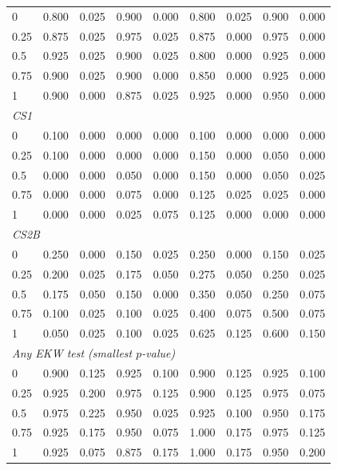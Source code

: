 \begin{table}[htbp]
\begin{tabular}{lcccccccc}
0 & 0.800 & 0.025 & 0.900 & 0.000 & 0.800 & 0.025 & 0.900 & 0.000 \\
0.25 & 0.875 & 0.025 & 0.975 & 0.025 & 0.875 & 0.000 & 0.975 & 0.000 \\
0.5 & 0.925 & 0.025 & 0.900 & 0.025 & 0.800 & 0.000 & 0.925 & 0.000 \\
0.75 & 0.900 & 0.025 & 0.900 & 0.000 & 0.850 & 0.000 & 0.925 & 0.000 \\
1 & 0.900 & 0.000 & 0.875 & 0.025 & 0.925 & 0.000 & 0.950 & 0.000 \\
\midrule
\multicolumn{9}{l}{\textit{CS1}} \\
0 & 0.100 & 0.000 & 0.000 & 0.000 & 0.100 & 0.000 & 0.000 & 0.000 \\
0.25 & 0.100 & 0.000 & 0.000 & 0.000 & 0.150 & 0.000 & 0.050 & 0.000 \\
0.5 & 0.000 & 0.000 & 0.050 & 0.000 & 0.150 & 0.000 & 0.050 & 0.025 \\
0.75 & 0.000 & 0.000 & 0.075 & 0.000 & 0.125 & 0.025 & 0.025 & 0.000 \\
1 & 0.000 & 0.000 & 0.025 & 0.075 & 0.125 & 0.000 & 0.000 & 0.000 \\
\midrule
\multicolumn{9}{l}{\textit{CS2B}} \\
0 & 0.250 & 0.000 & 0.150 & 0.025 & 0.250 & 0.000 & 0.150 & 0.025 \\
0.25 & 0.200 & 0.025 & 0.175 & 0.050 & 0.275 & 0.050 & 0.250 & 0.025 \\
0.5 & 0.175 & 0.050 & 0.150 & 0.000 & 0.350 & 0.050 & 0.250 & 0.075 \\
0.75 & 0.100 & 0.025 & 0.100 & 0.025 & 0.400 & 0.075 & 0.500 & 0.075 \\
1 & 0.050 & 0.025 & 0.100 & 0.025 & 0.625 & 0.125 & 0.600 & 0.150 \\
\midrule
\multicolumn{9}{l}{\textit{Any EKW test (smallest $p$-value)}} \\
0 & 0.900 & 0.125 & 0.925 & 0.100 & 0.900 & 0.125 & 0.925 & 0.100 \\
0.25 & 0.925 & 0.200 & 0.975 & 0.125 & 0.900 & 0.125 & 0.975 & 0.075 \\
0.5 & 0.975 & 0.225 & 0.950 & 0.025 & 0.925 & 0.100 & 0.950 & 0.175 \\
0.75 & 0.925 & 0.175 & 0.950 & 0.075 & 1.000 & 0.175 & 0.975 & 0.125 \\
1 & 0.925 & 0.075 & 0.875 & 0.175 & 1.000 & 0.175 & 0.950 & 0.200 \\
\bottomrule
\end{tabular}
\par\smallskip

\end{table}

